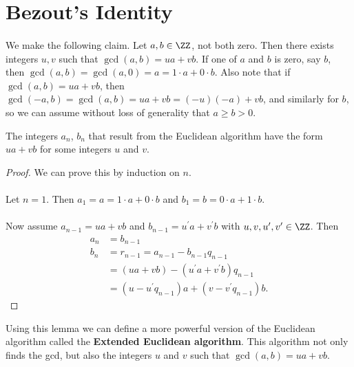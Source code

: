 \documentclass[../abstract_algebra.tex]{subfiles}
\begin{document}
    \section{Bezout's Identity}
        \paragraph{}
        We make the following claim.
        Let $a,b\in\ZZ$, not both zero. Then there exists integers $u,v$ such that $\gcd(a,b)=ua+vb$.
        If one of $a$ and $b$ is zero, say $b$, then $\gcd(a,b)=\gcd(a,0)=a=1\cdot a+0\cdot b$.
        Also note that if $\gcd(a,b)=ua+vb$, then $\gcd(-a,b)=\gcd(a,b)=ua+vb=(-u)(-a)+vb$, and similarly for $b$, so we can assume without loss of generality that $a\geq b>0$.
        \begin{lemma}
            The integers $a_n$, $b_n$ that result from the Euclidean algorithm have the form $ua+vb$ for some integers $u$ and $v$.
        \end{lemma}
        \begin{proof}
            We can prove this by induction on $n$.
            
            \paragraph{}
            Let $n=1$. Then $a_1=a=1\cdot a+0\cdot b$ and $b_1=b=0\cdot a+1\cdot b$.

            \paragraph{}
            Now assume $a_{n-1}=ua+vb$ and $b_{n-1}=u^\prime a+v^\prime b$ with $u,v,u^\prime,v^\prime\in\ZZ$.
            Then
            \begin{align}
                a_n&=b_{n-1}\\
                b_n&=r_{n-1}=a_{n-1}-b_{n-1}q_{n-1}\\
                &=(ua+vb)-(u^\prime a+v^\prime b)q_{n-1}\\
                &=(u-u^\prime q_{n-1})a+(v-v^\prime q_{n-1})b.
            \end{align}
        \end{proof}
        Using this lemma we can define a more powerful version of the Euclidean algorithm called the \textbf{Extended Euclidean algorithm}.
        This algorithm not only finds the gcd, but also the integers $u$ and $v$ such that $\gcd(a,b)=ua+vb$.
\end{document}
